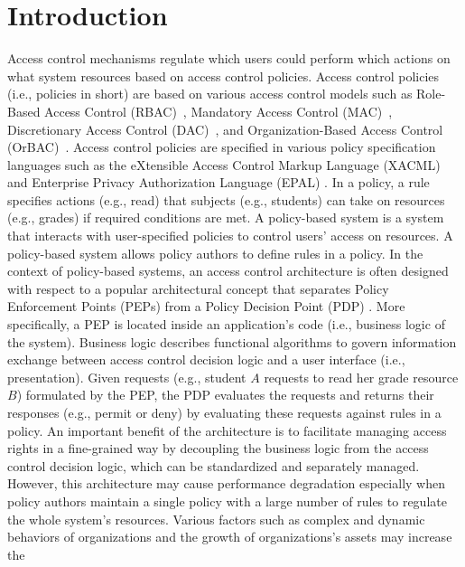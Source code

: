 \section{Introduction} \label{sec:introduction}
Access control mechanisms regulate which users
could perform which actions on what system resources based on access control policies.
Access control policies (i.e., policies in short) are based on various access control models such as Role-Based Access Control (RBAC)~\cite{ferraiolo:rbac}, Mandatory Access Control (MAC)~\cite{mac}, 
Discretionary Access Control (DAC)~\cite{dac}, and 
Organization-Based Access Control (OrBAC)~\cite{orbac}. Access control policies are specified in various policy specification languages such
as the eXtensible Access Control Markup Language (XACML) \cite{sunxacml}
and Enterprise Privacy Authorization Language (EPAL) \cite{epal}.
In a policy, a rule specifies actions (e.g., read) that subjects (e.g., students) can take on resources (e.g., grades) if required conditions are met. 
A policy-based system is a system that interacts with user-specified policies
to control users' access on resources. A policy-based system allows policy authors to define rules in a policy.
In the context of policy-based systems, an access control architecture is often designed with respect to a popular
architectural concept that separates Policy Enforcement Points (PEPs) from a Policy Decision Point (PDP) \cite{separation}. More specifically, a PEP is located inside an 
application's code (i.e., business logic of the system). Business logic describes functional algorithms to govern information exchange between access control decision logic and a user interface (i.e., presentation).
Given requests (e.g., student $A$ requests to read her grade resource $B$) formulated by the PEP, the PDP evaluates the requests and returns their responses (e.g., permit or deny) by evaluating these requests
against rules in a policy. An important benefit of the architecture is to facilitate managing access rights in a fine-grained way by
decoupling the business logic from the access control decision logic, which can be standardized and separately managed.
However, this architecture may cause performance degradation especially when policy authors maintain a single policy with a large number of rules to regulate the whole system's resources.
Various factors such as complex and dynamic behaviors of organizations and the growth of organizations's assets may increase the
